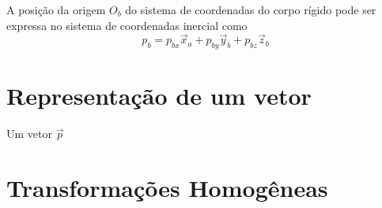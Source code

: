 A posição da origem $O_b$ do sistema de coordenadas do corpo rígido pode ser expressa no sistema de coordenadas inercial como 
\begin{equation}
p_b = p_{bx} \vec{x}_a + p_{by} \vec{y}_b + p_{bz} \vec{z}_b 
\end{equation}

\section{Representação de um vetor}

Um vetor $\vec{p}$


\section{Transformações Homogêneas}